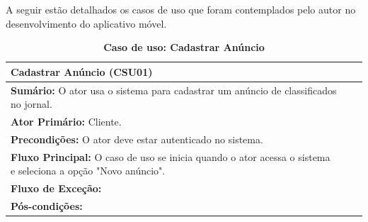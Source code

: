 \documentclass[
	12pt,				%
	openright,			%
	oneside,			%
	a4paper,			%
	chapter=TITLE,		%
	section=TITLE,		%
	english,			%
	french,				%
	spanish,			%
	brazil				%
	]{abntex2}
\begin{document}
A seguir estão detalhados os casos de uso que foram contemplados pelo autor no desenvolvimento do aplicativo móvel.

\begin{table}[h!]
	\center\scriptsize
	\caption{\textbf{Caso de uso: Cadastrar Anúncio}}
	\begin{tabular}{|l|c|c|} \hline \label{tab-csu-cadastrarAnuncio}
		\textbf{Cadastrar Anúncio (CSU01)} \\ \hline
		
		\textbf{Sumário:} O ator usa o sistema para cadastrar um anúncio de classificados no jornal. \\
		\textbf{Ator Primário:} Cliente. \\
		\textbf{Precondições:} O ator deve estar autenticado no sistema. \\ \hline
		
		\textbf{Fluxo Principal:} O caso de uso se inicia quando o ator acessa o sistema e seleciona a opção "Novo anúncio". \\ \hline

		\textbf{Fluxo de Exceção:} \\ \hline
		
		\textbf{Pós-condições:} \\ \hline
				
	\end{tabular}
\end{table}
\end{document}
